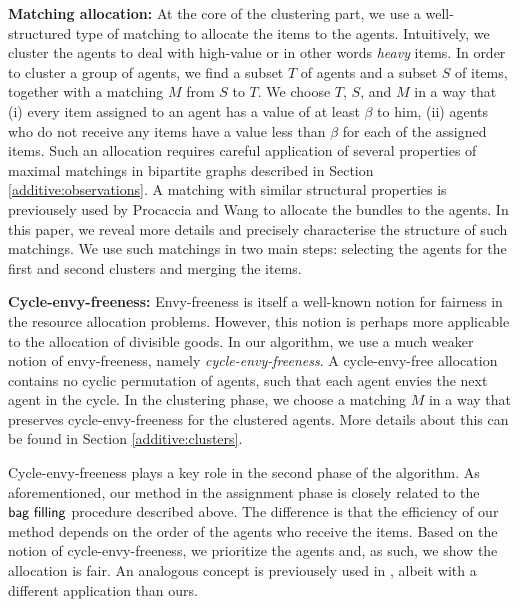 \textbf{Matching allocation:} At the core of the clustering part, we use a well-structured type of matching to allocate the items to the agents. Intuitively, we cluster the agents to deal with high-value or in other words \textit{heavy} items. %
In order to cluster a group of agents, we find a subset $T$ of agents and a subset $S$ of items, together with a matching $M$ from $S$ to $T$. We choose $T$, $S$, and $M$ in a way that (i) every item assigned to an agent has a value of at least $\beta$ to him, (ii) agents who do not receive any items have a value less than $\beta$ for each of the assigned items. Such an allocation requires careful application of several properties of maximal matchings in bipartite graphs described in Section \ref{additive:observations}.  A matching with similar structural properties is previousely used by Procaccia and Wang \cite{Procaccia:first} to allocate the bundles to the agents. In this paper, we reveal more details and precisely characterise the structure of such matchings. We use such matchings in two main steps: selecting the agents for the first and second clusters and merging the items. 




\textbf{Cycle-envy-freeness:} Envy-freeness is itself a well-known notion for fairness in the resource allocation problems. However, this notion is perhaps more applicable to the allocation of divisible goods. In our algorithm, we use a much weaker notion of envy-freeness, namely \textit{cycle-envy-freeness}. A cycle-envy-free allocation contains no cyclic permutation of agents, such that each agent envies the next agent in the cycle. In the clustering phase, we choose a matching $M$ in a way that preserves cycle-envy-freeness for the clustered agents. More details about this can be found in Section \ref{additive:clusters}. 

Cycle-envy-freeness plays a key role in the second phase of the algorithm. As aforementioned, our method in the assignment phase is closely related to the $\textsf{bag filling}$ procedure described above. The difference is that the efficiency of our method depends on the order of the agents who receive the items. Based on the notion of cycle-envy-freeness, we prioritize the agents and, as such, we show the allocation is fair. An analogous concept is previousely used in \cite{Saberi:first}, albeit with a different application than ours. 


